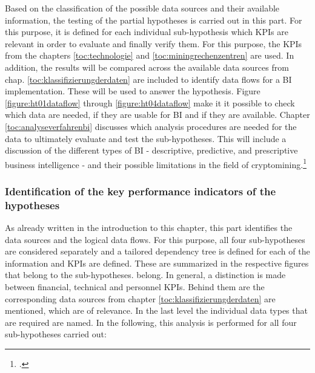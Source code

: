 Based on the classification of the possible data sources and their available information, the testing of the partial hypotheses is carried out in this part.
For this purpose, it is defined for each individual sub-hypothesis which \acp{KPI} are relevant in order to evaluate and finally verify them.
For this purpose, the \acp{KPI} from the chapters \ref{toc:technologie} and
\ref{toc:miningrechenzentren} are used. In addition, the results will be compared across the available data sources from chap.
\ref{toc:klassifizierungderdaten} are included to identify data flows for a \ac{BI} implementation. These
will be used to answer the hypothesis. Figure \ref{figure:ht01dataflow} through \ref{figure:ht04dataflow} make it
it possible to check which data are needed, if they are usable for \ac{BI} and if they are available.
Chapter \ref{toc:analyseverfahrenbi} discusses which analysis procedures are needed for the data to ultimately
evaluate and test the sub-hypotheses. This will include a discussion of the different types of \ac{BI} - descriptive,
predictive, and prescriptive business intelligence - and their possible
limitations in the field of cryptomining.\footcite[Cf.][p. 96]{bihani2014comparative}

\subsubsection{Identification of the key performance indicators of the hypotheses} \label{toc:identifikationkpi}

As already written in the introduction to this chapter, this part identifies the data sources and the logical data flows.
For this purpose, all four sub-hypotheses are considered separately and a tailored dependency tree is defined for each of the
information and \acp{KPI} are defined. These are summarized in the respective figures that belong to the sub-hypotheses.
belong. In general, a distinction is made between financial, technical and personnel \acp{KPI}. Behind them are the
corresponding data sources from chapter \ref{toc:klassifizierungderdaten} are mentioned, which are of relevance. In the last level
the individual data types that are required are named. In the following, this analysis is performed for all four sub-hypotheses
carried out:

